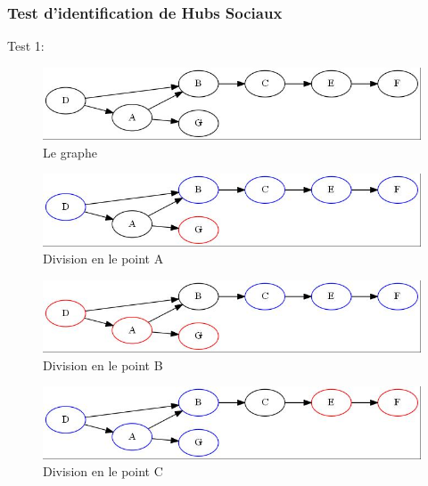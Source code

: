 \documentclass[12pt, oneside]{article}
\begin{document}
\subsubsection{Test d'identification de Hubs Sociaux}
Test 1:\\
\begin{figure}[!h]
    \centering
    \includegraphics[scale=0.7,trim=3 3 3 3,clip]{artipointdefault}
    \caption{Le graphe}
\end{figure}
\begin{figure}[!h]
    \centering
    \includegraphics[scale=0.7,trim=3 3 3 3,clip]{artipointA}
    \caption{Division en le point A}
\end{figure}
\begin{figure}[!h]
    \centering
    \includegraphics[scale=0.7,trim=3 3 3 3,clip]{artipointB}
    \caption{Division en le point B}
\end{figure}
\begin{figure}[!h]
    \centering
    \includegraphics[scale=0.7,trim=3 3 3 3,clip]{artipointC}
    \caption{Division en le point C}
\end{figure}
\end{document}
